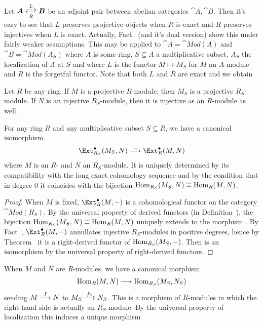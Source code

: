 \documentclass[a4paper,parskip=half,numbers=enddot, DIV=12]{scrreprt}
\begin{document}
Let ${\cat A}\doublelrmorphism[L][\smash{R}]{\cat B}$ be an adjoint pair between abelian categories ${\cat A},{\cat B}$. Then it's easy to see that $L$ preserves projective objects when $R$ is exact and $R$ preserves injectives when $L$ is exact. Actually, Fact~ (and it's dual version) show this under fairly weaker assumptions. This may be applied to $\cat A=\cat{Mod}(A)$ and $\cat B=\cat{Mod}(A_S)$ where $A$ is some ring, $S\subseteq A$ a multiplicative subset, $A_S$ the localization of $A$ at $S$ and where $L$ is the functor $M\mapsto M_S$ for $M$ an $A$-module and $R$ is the forgetful functor. Note that both $L$ and $R$ are exact and we obtain
\begin{fact}
	Let $R$ be any ring. If $M$ is a projective $R$-module, then $M_S$ is a projective $R_S$-module. If $N$ is an injective $R_S$-module, then it is injective as an $R$-module as well.
\end{fact}
\begin{fact}
	For any ring $R$ and any multiplicative subset $S\subseteq R$, we have a canonical isomorphism
	\begin{align}\lbl{eq:ExtRStoExtR}
		\Ext_{R_S}^\bullet(M_S,N)\isomorphism\Ext_R^\bullet(M,N)
	\end{align}
	where $M$ is an $R$- and $N$ an $R_S$-module. It is uniquely determined by its compatibility with the long exact cohomology sequence and by the condition that in degree $0$ it coincides with the bijection $\operatorname{Hom}_{R_S}(M_S,N)\cong \operatorname{Hom}_R(M,N)$.
\end{fact}
\begin{proof}
	When $M$ is fixed, $\Ext_R^\bullet(M,-)$ is a cohomological functor on the category $\cat{Mod}(R_S)$. By the universal property of derived functors (in Definition~), the bijection $\operatorname{Hom}_{R_S}(M_S,N)\cong \operatorname{Hom}_R(M,N)$ uniquely extends to the morphism . By Fact~, $\Ext_R^\bullet(M,-)$ annullates injective $R_S$-modules in positive degrees, hence by Theorem~ it is a right-derived functor of $\operatorname{Hom}_{R_S}(M_S,-)$. Then  is an isomorphism by the universal property of right-derived functors.
\end{proof}
When $M$ and $N$ are $R$-modules, we have a canonical morphism
\begin{align*}
	\Hom_R(M,N)\morphism\Hom_{R_S}(M_S,N_S)
\end{align*}
sending $M\morphism[f]N$ to $M_S\morphism[f_S]N_S$. This is a morphism of $R$-modules in which the right-hand side is actually an $R_S$-module. By the universal property of localization this induces a unique morphism
\end{document}
